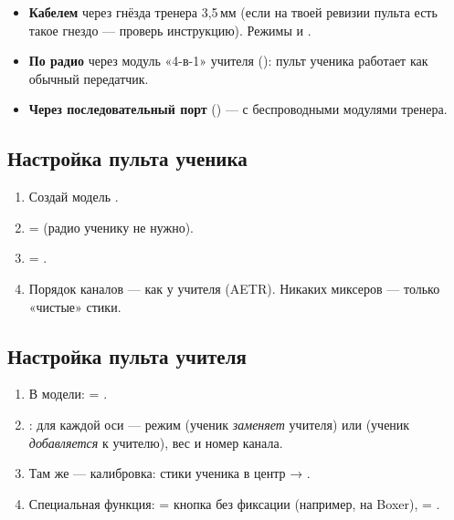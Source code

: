 \begin{itemize}
  \item \textbf{Кабелем} через гнёзда тренера 3,5\,мм (если на твоей ревизии пульта есть
        такое гнездо --- проверь инструкцию). Режимы  и .
  \item \textbf{По радио} через модуль «4-в-1» учителя (): пульт ученика
        работает как обычный передатчик.
  \item \textbf{Через последовательный порт} () --- с беспроводными
        модулями тренера.
\end{itemize}

\subsection{Настройка пульта ученика}

\begin{enumerate}
  \item Создай модель .
  \item {} =  (радио ученику не нужно).
  \item {} = .
  \item Порядок каналов --- как у учителя (AETR). Никаких миксеров --- только «чистые» стики.
\end{enumerate}

\subsection{Настройка пульта учителя}

\begin{enumerate}
  \item В модели:  = .
  \item {}: для каждой оси --- режим \menu{:=} (ученик \emph{заменяет}
        учителя) или \menu{+=} (ученик \emph{добавляется} к учителю), вес и номер канала.
  \item Там же --- калибровка: стики ученика в центр → .
  \item Специальная функция:  = кнопка без фиксации (например,  на Boxer),
         = .
\end{enumerate}

\begin{center}
\end{center}

